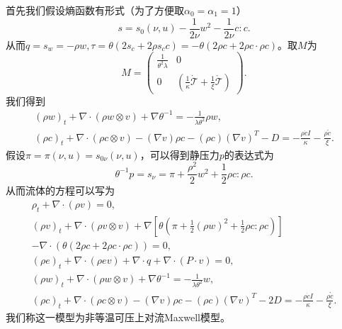 	首先我们假设熵函数有形式（为了方便取$\alpha_0=\alpha_1=1$）
	\begin{equation*}
			s = s_0(\nu,u)  - \frac{1}{2 \nu } w^2 - \frac{1}{2  \nu } c:c.
	\end{equation*}
	从而$q=s_w=-{\rho w},\tau = \theta(2s_c + 2 \rho s_c c)= - \theta (2 \rho c + 2 \rho c \cdot \rho c)$。取$M$为
	\begin{equation*}
		M = \left( \begin{array}{ccc} 
			\frac{1}{\theta^2 \lambda} & 0 \\
			0 &  (\frac{1}{\kappa}\dot{\mathcal{T}}  +  \frac{1}{\xi}\mathring{\mathcal{T}}  )
		\end{array} \right).
	\end{equation*}
	我们得到
\begin{eqnarray*}
			(\rho w)_t +  \nabla \cdot (\rho w \otimes v)  + \nabla \theta^{-1} = -\frac{1}{\lambda \theta^2}  \rho w, \\
			(\rho c)_t +  \nabla \cdot (\rho c \otimes v) - (\nabla v) \rho c - (\rho c) (\nabla v)^T - D = - \frac{\rho \dot{c}I}{\kappa} -  \frac{\rho \mathring{c}}{\xi} .
\end{eqnarray*}
假设$\pi=\pi(\nu,u) = s_{0\nu}(\nu,u)$，可以得到静压力$p$的表达式为
\begin{equation*}
			\theta^{-1} p = s_\nu = \pi +\frac{\rho^2}{2} w^2 + \frac{1}{2} \rho c: \rho c.
\end{equation*}
从而流体的方程可以写为
\begin{subequations} \label{eq:ECDFsecond}
		\begin{align}
			\rho_t + \nabla \cdot (\rho v) = 0 ,\\
			(\rho v)_t + \nabla \cdot (\rho v \otimes v) + \nabla [\theta(\pi +\frac{1}{2} (\rho w)^2 + \frac{1}{2} \rho c: \rho c)] \nonumber \\
			 - \nabla \cdot (\theta (2 \rho c + 2 \rho c \cdot \rho c)) =0 ,\\
			(\rho e)_t + \nabla \cdot (\rho e v) + \nabla \cdot q + \nabla \cdot (P \cdot v) = 0, \\
			(\rho w)_t + \nabla \cdot (\rho w \otimes v) + \nabla \theta^{-1} = -\frac{1}{\lambda \theta^2} w, \\
			(\rho c)_t +  \nabla \cdot (\rho c \otimes v) - (\nabla v) \rho c - (\rho c) (\nabla v)^T - 2 D = - \frac{\rho \dot{c}I}{\kappa} -  \frac{\rho \mathring{c}}{\xi}  .
		\end{align}
	\end{subequations}
	我们称这一模型为非等温可压上对流Maxwell模型。

